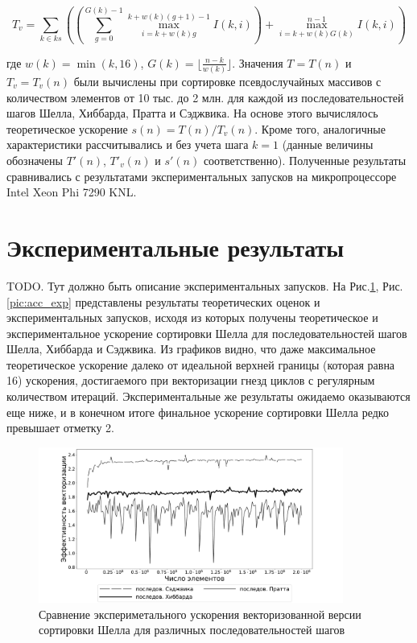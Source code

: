 \documentclass[utf8]{psta}
\begin{document}
\begin{equation}
T_v = \sum_{k \in ks}
{
\left(
\left(
\sum_{g = 0}^{G(k) - 1}{\max_{i = k + w(k)g}^{k + w(k)(g + 1) - 1}{I(k, i)}}
\right)
+ \max_{i = k + w(k)G(k)}^{n - 1}{I(k, i)}
\right)
}
\end{equation}

где $w(k) = \min(k, 16)$, $G(k) = \lfloor \frac{n - k}{w(k)} \rfloor$. Значения $T = T(n)$ и $T_v = T_v(n)$ были вычислены при сортировке псевдослучайных массивов с количеством элементов от 10 тыс. до 2 млн. для каждой из последовательностей шагов Шелла, Хиббарда, Пратта и Сэджвика. На основе этого вычислялось теоретическое ускорение $s(n) = T(n)/T_v(n)$. Кроме того, аналогичные характеристики рассчитывались и без учета шага $k = 1$ (данные величины обозначены $T'(n)$, $T'_v(n)$ и $s'(n)$ соответственно). Полученные результаты сравнивались с результатами экспериментальных запусков на микропроцессоре Intel Xeon Phi 7290 KNL.

\section{Экспериментальные результаты}

TODO.
Тут должно быть описание экспериментальных запусков. На Рис.\ref{pic:acc_theor}, Рис.\ref{pic:acc_exp} представлены результаты теоретических оценок и экспериментальных запусков, исходя из которых получены теоретическое и экспериментальное ускорение сортировки Шелла для последовательностей шагов Шелла, Хиббарда и Сэджвика. Из графиков видно, что даже максимальное теоретическое ускорение далеко от идеальной верхней границы (которая равна 16) ускорения, достигаемого при векторизации гнезд циклов с регулярным количеством итераций. Экспериментальные же результаты ожидаемо оказываются еще ниже, и в конечном итоге финальное ускорение сортировки Шелла редко превышает отметку 2.

\begin{figure}
\includegraphics[width=10cm]{pics/experimental_eff}
\caption{Сравнение экспериметального ускорения векторизованной версии сортировки Шелла для различных последовательностей шагов}
\label{pic:acc_theor}
\end{figure}
\end{document}
